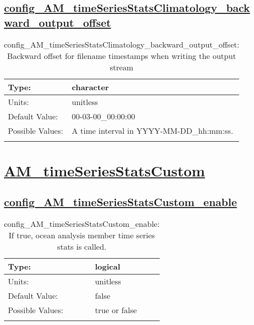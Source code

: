 \subsection[config\_AM\_timeSeriesStatsClimatology\_backward\_output\_offset]{\hyperref[sec:nm_tab_AM_timeSeriesStatsClimatology]{config\_AM\_timeSeriesStatsClimatology\_backward\_output\_offset}}
\label{subsec:nm_sec_config_AM_timeSeriesStatsClimatology_backward_output_offset}
\begin{center}
\begin{longtable}{| p{2.0in} || p{4.0in} |}
    \hline
    Type: & character \\
    \hline
    Units: & \si{unitless} \\
    \hline
    Default Value: & 00-03-00\_00:00:00 \\
    \hline
    Possible Values: & A time interval in YYYY-MM-DD\_hh:mm:ss. \\
    \hline
    \caption{config\_AM\_timeSeriesStatsClimatology\_backward\_output\_offset: Backward offset for filename timestamps when writing the output stream}
\end{longtable}
\end{center}
\section[AM\_timeSeriesStatsCustom]{\hyperref[sec:nm_tab_AM_timeSeriesStatsCustom]{AM\_timeSeriesStatsCustom}}
\label{sec:nm_sec_AM_timeSeriesStatsCustom}
\subsection[config\_AM\_timeSeriesStatsCustom\_enable]{\hyperref[sec:nm_tab_AM_timeSeriesStatsCustom]{config\_AM\_timeSeriesStatsCustom\_enable}}
\label{subsec:nm_sec_config_AM_timeSeriesStatsCustom_enable}
\begin{center}
\begin{longtable}{| p{2.0in} || p{4.0in} |}
    \hline
    Type: & logical \\
    \hline
    Units: & \si{unitless} \\
    \hline
    Default Value: & false \\
    \hline
    Possible Values: & true or false \\
    \hline
    \caption{config\_AM\_timeSeriesStatsCustom\_enable: If true, ocean analysis member time series stats is called.}
\end{longtable}
\end{center}
